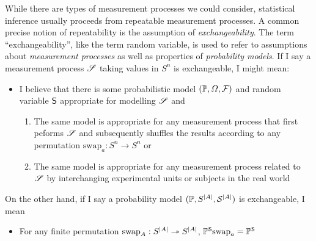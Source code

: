 While there are types of measurement processes we could consider, statistical inference usually proceeds from repeatable measurement processes. A common precise notion of repeatability is the assumption of \emph{exchangeability}. The term ``exchangeability'', like the term random variable, is used to refer to assumptions about \emph{measurement processes} as well as properties of \emph{probability models}. If I say a measurement process $\mathscr{S}$ taking values in $S^n$ is exchangeable, I might mean:
\begin{itemize}
    \item I believe that there is some probabilistic model $(\mathbb{P},\Omega,\mathcal{F})$ and random variable $\mathsf{S}$ appropriate for modelling $\mathscr{S}$ and
    \begin{enumerate}
        \item The same model is appropriate for any measurement process that first peforms $\mathscr{S}$ and subsequently shuffles the results according to any permutation $\text{swap}_a:S^n\to S^n$ or
        \item The same model is appropriate for any measurement process related to $\mathscr{S}$ by interchanging experimental units or subjects in the real world
    \end{enumerate} 
\end{itemize}

On the other hand, if I say a probability model $(\mathbb{P},S^{|A|},\mathcal{S}^{|A|})$ is exchangeable, I mean

\begin{itemize}
    \item For any finite permutation $\text{swap}_A:S^{|A|}\rightarrowtriangle S^{|A|}$, $\mathbb{P}^{\mathsf{S}}\text{swap}_{a} = \mathbb{P}^{\mathsf{S}}$
\end{itemize}

